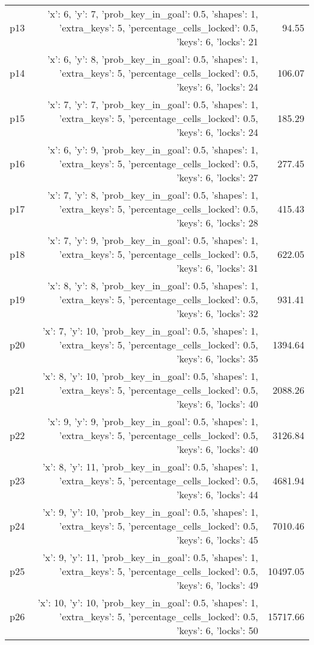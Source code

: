 \documentclass{article}
\begin{document}
\begin{center}
\begin{tabular}{@{}l|r|r@{}}
  p13&{'x': 6, 'y': 7, 'prob\_key\_in\_goal': 0.5, 'shapes': 1, 'extra\_keys': 5, 'percentage\_cells\_locked': 0.5, 'keys': 6, 'locks': 21}&94.55\\
  p14&{'x': 6, 'y': 8, 'prob\_key\_in\_goal': 0.5, 'shapes': 1, 'extra\_keys': 5, 'percentage\_cells\_locked': 0.5, 'keys': 6, 'locks': 24}&106.07\\
  p15&{'x': 7, 'y': 7, 'prob\_key\_in\_goal': 0.5, 'shapes': 1, 'extra\_keys': 5, 'percentage\_cells\_locked': 0.5, 'keys': 6, 'locks': 24}&185.29\\
  p16&{'x': 6, 'y': 9, 'prob\_key\_in\_goal': 0.5, 'shapes': 1, 'extra\_keys': 5, 'percentage\_cells\_locked': 0.5, 'keys': 6, 'locks': 27}&277.45\\
  p17&{'x': 7, 'y': 8, 'prob\_key\_in\_goal': 0.5, 'shapes': 1, 'extra\_keys': 5, 'percentage\_cells\_locked': 0.5, 'keys': 6, 'locks': 28}&415.43\\
  p18&{'x': 7, 'y': 9, 'prob\_key\_in\_goal': 0.5, 'shapes': 1, 'extra\_keys': 5, 'percentage\_cells\_locked': 0.5, 'keys': 6, 'locks': 31}&622.05\\
  p19&{'x': 8, 'y': 8, 'prob\_key\_in\_goal': 0.5, 'shapes': 1, 'extra\_keys': 5, 'percentage\_cells\_locked': 0.5, 'keys': 6, 'locks': 32}&931.41\\
  p20&{'x': 7, 'y': 10, 'prob\_key\_in\_goal': 0.5, 'shapes': 1, 'extra\_keys': 5, 'percentage\_cells\_locked': 0.5, 'keys': 6, 'locks': 35}&1394.64\\
  p21&{'x': 8, 'y': 10, 'prob\_key\_in\_goal': 0.5, 'shapes': 1, 'extra\_keys': 5, 'percentage\_cells\_locked': 0.5, 'keys': 6, 'locks': 40}&2088.26\\
  p22&{'x': 9, 'y': 9, 'prob\_key\_in\_goal': 0.5, 'shapes': 1, 'extra\_keys': 5, 'percentage\_cells\_locked': 0.5, 'keys': 6, 'locks': 40}&3126.84\\
  p23&{'x': 8, 'y': 11, 'prob\_key\_in\_goal': 0.5, 'shapes': 1, 'extra\_keys': 5, 'percentage\_cells\_locked': 0.5, 'keys': 6, 'locks': 44}&4681.94\\
  p24&{'x': 9, 'y': 10, 'prob\_key\_in\_goal': 0.5, 'shapes': 1, 'extra\_keys': 5, 'percentage\_cells\_locked': 0.5, 'keys': 6, 'locks': 45}&7010.46\\
  p25&{'x': 9, 'y': 11, 'prob\_key\_in\_goal': 0.5, 'shapes': 1, 'extra\_keys': 5, 'percentage\_cells\_locked': 0.5, 'keys': 6, 'locks': 49}&10497.05\\
  p26&{'x': 10, 'y': 10, 'prob\_key\_in\_goal': 0.5, 'shapes': 1, 'extra\_keys': 5, 'percentage\_cells\_locked': 0.5, 'keys': 6, 'locks': 50}&15717.66\\

\end{tabular}
\end{center}
\end{document}
